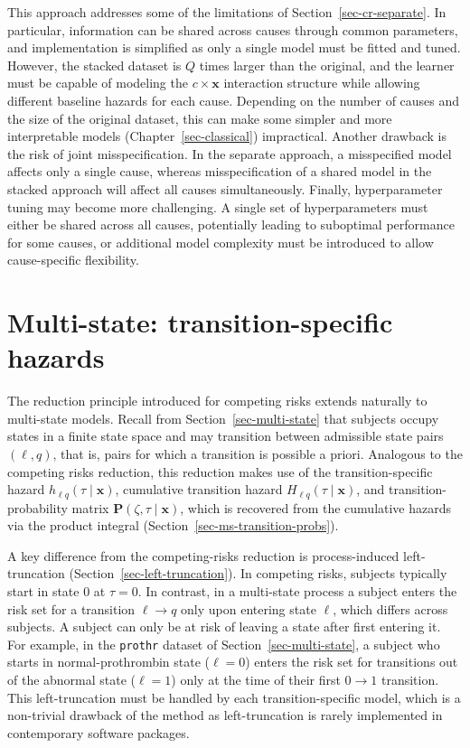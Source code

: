 \documentclass[
  letterpaper,
  krantz2]{style/krantz}
\begin{document}
This approach addresses some of the limitations of
Section~\ref{sec-cr-separate}. In particular, information can be shared
across causes through common parameters, and implementation is
simplified as only a single model must be fitted and tuned. However, the
stacked dataset is \(Q\) times larger than the original, and the learner
must be capable of modeling the \(c \times \mathbf{x}\) interaction
structure while allowing different baseline hazards for each cause.
Depending on the number of causes and the size of the original dataset,
this can make some simpler and more interpretable models
(Chapter~\ref{sec-classical}) impractical. Another drawback is the risk
of joint misspecification. In the separate approach, a misspecified
model affects only a single cause, whereas misspecification of a shared
model in the stacked approach will affect all causes simultaneously.
Finally, hyperparameter tuning may become more challenging. A single set
of hyperparameters must either be shared across all causes, potentially
leading to suboptimal performance for some causes, or additional model
complexity must be introduced to allow cause-specific flexibility.

\section{Multi-state: transition-specific
hazards}\label{sec-ms-reduction}

The reduction principle introduced for competing risks extends naturally
to multi-state
models.
Recall from Section~\ref{sec-multi-state} that subjects occupy states in
a finite state space and may transition between admissible state pairs
\((\ell, q)\), that is, pairs for which a transition is possible a
priori. Analogous to the competing risks reduction, this reduction makes
use of the transition-specific hazard
\(h_{\ell q}(\tau \mid \mathbf{x})\), cumulative transition hazard
\(H_{\ell q}(\tau \mid \mathbf{x})\), and
transition-probability matrix
\(\mathbf{P}(\zeta, \tau \mid \mathbf{x})\), which is recovered from the
cumulative hazards via the product integral
(Section~\ref{sec-ms-transition-probs}).

A key difference from the competing-risks reduction is process-induced
left-truncation
(Section~\ref{sec-left-truncation}). In competing
risks, subjects typically start in state \(0\) at \(\tau = 0\). In
contrast, in a multi-state process a subject enters the risk set for a
transition \(\ell \to q\) only upon entering state \(\ell\), which
differs across subjects. A subject can only be at risk of leaving a
state after first entering it. For example, in the \texttt{prothr}
dataset of Section~\ref{sec-multi-state}, a subject who starts in
normal-prothrombin state (\(\ell = 0\)) enters the risk set for
transitions out of the abnormal state (\(\ell = 1\)) only at the time of
their first \(0 \to 1\) transition. This left-truncation must be handled
by each transition-specific model, which is a non-trivial drawback of
the method as left-truncation is rarely implemented in contemporary
software packages.
\end{document}
